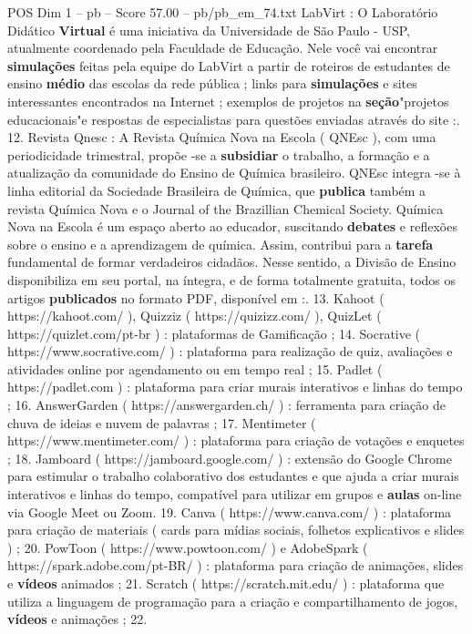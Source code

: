 \begin{textsample}{POS Dim 1 – pb – Score 57.00 – pb/pb\_em\_74.txt}
LabVirt : O Laboratório Didático \textbf{Virtual} é uma iniciativa da Universidade de São Paulo - USP, atualmente coordenado pela Faculdade de Educação.
Nele você vai encontrar \textbf{simulações} feitas pela equipe do LabVirt a partir de roteiros de estudantes de ensino \textbf{médio} das escolas da rede pública ; links para \textbf{simulações} e sites interessantes encontrados na Internet ; exemplos de projetos na \textbf{seção}"projetos educacionais"e respostas de especialistas para questões enviadas através do site :. 12.
Revista Qnesc : A Revista Química Nova na Escola ( QNEsc ), com uma periodicidade trimestral, propõe -se a \textbf{subsidiar} o trabalho, a formação e a atualização da comunidade do Ensino de Química brasileiro.
QNEsc integra -se à linha editorial da Sociedade Brasileira de Química, que \textbf{publica} também a revista Química Nova e o Journal of the Brazillian Chemical Society.
Química Nova na Escola é um espaço aberto ao educador, suscitando \textbf{debates} e reflexões sobre o ensino e a aprendizagem de química.
Assim, contribui para a \textbf{tarefa} fundamental de formar verdadeiros cidadãos.
Nesse sentido, a Divisão de Ensino disponibiliza em seu portal, na íntegra, e de forma totalmente gratuita, todos os artigos \textbf{publicados} no formato PDF, disponível em :. 13.
Kahoot ( https://kahoot.com/ ), Quizziz ( https://quizizz.com/ ), QuizLet ( https://quizlet.com/pt-br ) : plataformas de Gamificação ; 14.
Socrative ( https://www.socrative.com/ ) : plataforma para realização de quiz, avaliações e atividades online por agendamento ou em tempo real ; 15.
Padlet ( https://padlet.com ) : plataforma para criar murais interativos e linhas do tempo ; 16.
AnswerGarden ( https://answergarden.ch/ ) : ferramenta para criação de chuva de ideias e nuvem de palavras ; 17.
Mentimeter ( https://www.mentimeter.com/ ) : plataforma para criação de votações e enquetes ; 18.
Jamboard ( https://jamboard.google.com/ ) : extensão do Google Chrome para estimular o trabalho colaborativo dos estudantes e que ajuda a criar murais interativos e linhas do tempo, compatível para utilizar em grupos e \textbf{aulas} on-line via Google Meet ou Zoom. 19.
Canva ( https://www.canva.com/ ) : plataforma para criação de materiais ( cards para mídias sociais, folhetos explicativos e slides ) ; 20.
PowToon ( https://www.powtoon.com/ ) e AdobeSpark ( https://spark.adobe.com/pt-BR/ ) : plataforma para criação de animações, slides e \textbf{vídeos} animados ; 21.
Scratch ( https://scratch.mit.edu/ ) : plataforma que utiliza a linguagem de programação para a criação e compartilhamento de jogos, \textbf{vídeos} e animações ; 22.

\end{textsample}
